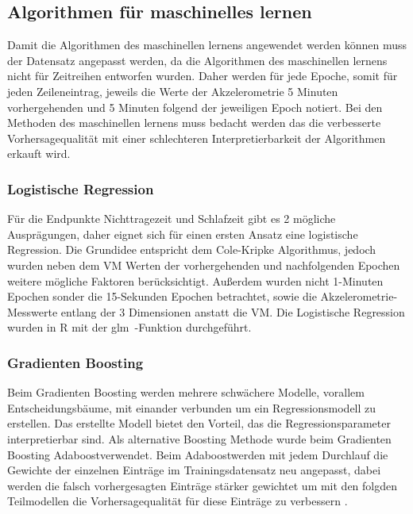 


\subsection{Algorithmen für maschinelles lernen}
Damit die Algorithmen des maschinellen lernens angewendet werden können muss der Datensatz angepasst werden, da die Algorithmen des maschinellen lernens nicht für Zeitreihen entworfen wurden. Daher werden für jede Epoche, somit für jeden Zeileneintrag, jeweils die Werte der Akzelerometrie 5 Minuten  vorhergehenden und 5 Minuten folgend der jeweiligen Epoch notiert. Bei den Methoden des maschinellen lernens muss bedacht werden das die verbesserte Vorhersagequalität mit einer schlechteren Interpretierbarkeit der Algorithmen erkauft wird.



\subsubsection{Logistische Regression}
Für die Endpunkte Nichttragezeit und Schlafzeit gibt es 2 mögliche Ausprägungen, daher eignet sich für einen ersten Ansatz eine logistische Regression. Die Grundidee entspricht dem Cole-Kripke Algorithmus, jedoch wurden neben dem \ac{VM} Werten der vorhergehenden und nachfolgenden Epochen weitere mögliche Faktoren berücksichtigt. Außerdem wurden nicht 1-Minuten Epochen sonder die 15-Sekunden Epochen betrachtet, sowie die Akzelerometrie-Messwerte entlang der 3 Dimensionen anstatt die \ac{VM}. Die Logistische Regression wurden in R mit der \glqq glm\grqq \ -Funktion durchgeführt.



\subsubsection{Gradienten Boosting}
Beim Gradienten Boosting werden mehrere schwächere Modelle, vorallem Entscheidungsbäume, mit einander verbunden um ein Regressionsmodell zu erstellen\cite{dummies}. Das erstellte Modell bietet den Vorteil, das die Regressionsparameter interpretierbar sind. 
Als alternative Boosting Methode wurde beim Gradienten Boosting \glqq Adaboost\grqq verwendet. Beim \glqq Adaboost\grqq  werden mit jedem Durchlauf die Gewichte der einzelnen Einträge im Trainingsdatensatz neu angepasst, dabei werden die falsch vorhergesagten Einträge stärker gewichtet um mit den folgden Teilmodellen die Vorhersagequalität für diese Einträge zu verbessern \cite{dummies}.

